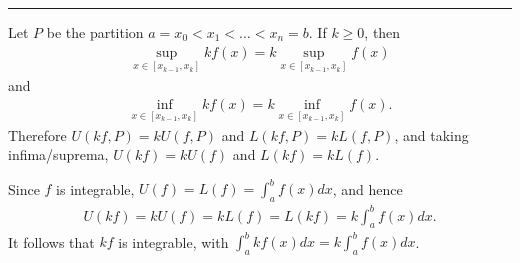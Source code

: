 \documentclass[letterpaper,10pt,english]{jupyterBook}
\begin{document}
\bigskip\hrule\bigskip


\sphinxAtStartPar
{\hyperref[\detokenize{Problems:id70}]{}} Let \(P\) be the partition \(a=x_0<x_1<\ldots<x_n=b\). If \(k\geq 0\), then
\begin{equation*}
\begin{split}
\sup_{x\in[x_{k-1},x_k]}kf(x) = k\sup_{x\in[x_{k-1},x_k]}f(x)
\end{split}
\end{equation*}
\sphinxAtStartPar
and
\begin{equation*}
\begin{split}
\inf_{x\in[x_{k-1},x_k]}kf(x) = k\inf_{x\in[x_{k-1},x_k]}f(x).
\end{split}
\end{equation*}
\sphinxAtStartPar
Therefore \(U(kf,P)=kU(f,P)\) and \(L(kf,P)=kL(f,P)\), and taking infima/suprema, \(U(kf)=kU(f)\) and \(L(kf)=kL(f)\).

\sphinxAtStartPar
Since \(f\) is integrable, \(U(f)=L(f)=\int_a^bf(x)dx\), and hence
\begin{equation*}
\begin{split}
U(kf)=kU(f)=kL(f)=L(kf)=k\int_a^bf(x)dx.
\end{split}
\end{equation*}
\sphinxAtStartPar
It follows that \(kf\) is integrable, with \(\displaystyle\int_a^bkf(x)dx=k\int_a^bf(x)dx\).
\end{document}
